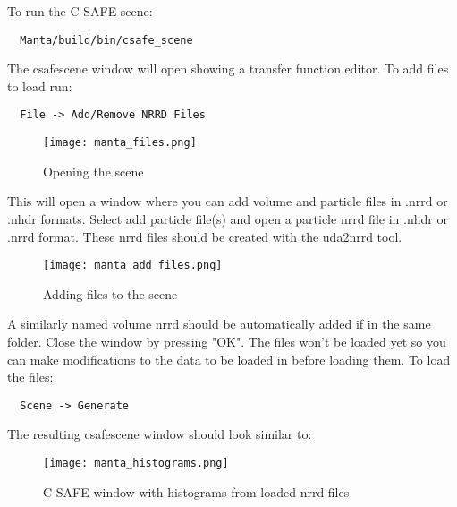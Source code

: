 To run the C-SAFE scene: 
\begin{Verbatim}
  Manta/build/bin/csafe_scene
\end{Verbatim}

The csafescene window will open showing a transfer function editor.  To add files to load run:
\begin{Verbatim}
  File -> Add/Remove NRRD Files
\end{Verbatim}

\begin{figure}[thb!]
  \center
  \texttt{[image: manta\_files.png]}
  \caption{Opening the scene}
  \label{fig:manta_files}
\end{figure}

This will open a window where you can add volume and particle files in .nrrd or .nhdr formats.  Select add particle file(s) and open a particle nrrd file in .nhdr or .nrrd format.  These nrrd files should be created with the uda2nrrd tool.

\begin{figure}[thb!]
  \center
  \texttt{[image: manta\_add\_files.png]}
  \caption{Adding files to the scene}
  \label{fig:manta_add_files}
\end{figure}

A similarly named volume nrrd should be automatically added if in the same folder.  Close the window by pressing "OK".  The files won't be loaded yet so you can make modifications to the data to be loaded in before loading them.  To load the files:

\begin{Verbatim}
  Scene -> Generate
\end{Verbatim}

The resulting csafescene window should look similar to:

\begin{figure}[thb!]
  \center
  \texttt{[image: manta\_histograms.png]}
  \caption{C-SAFE window with histograms from loaded nrrd files}
  \label{fig:manta_histograms}
\end{figure}